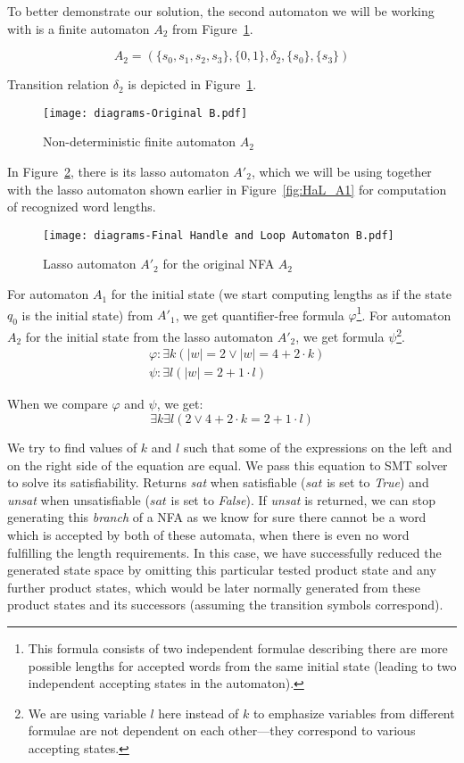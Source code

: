 To better demonstrate our solution, the second automaton we will be working with is a finite automaton $A_2$ from Figure~\ref{fig:NFA_A2_orig}.

$$ A_2 = (\{s_0, s_1, s_2, s_3\}, \{0, 1\}, \delta_2, \{s_0\}, \{s_3\}) $$

Transition relation $\delta_2$ is depicted in Figure~\ref{fig:NFA_A2_orig}.

\begin{figure}[ht]
    \centering
	\texttt{[image: diagrams-Original B.pdf]}
	\caption{Non-deterministic finite automaton $A_2$}
	\label{fig:NFA_A2_orig}
\end{figure}

In Figure~\ref{fig:HaL_A2}, there is its lasso automaton $A'_2$, which we will be using together with the lasso automaton shown earlier in Figure~\ref{fig:HaL_A1} for computation of recognized word lengths.

\begin{figure}[ht]
    \centering
	\texttt{[image: diagrams-Final Handle and Loop Automaton B.pdf]}
	\caption{Lasso automaton $A'_2$ for the original NFA $A_2$}
	\label{fig:HaL_A2}
\end{figure}

For automaton $A_1$ for the initial state (we start computing lengths as if the state $q_0$ is the initial state) from $A'_1$, we get quantifier-free formula $\varphi$\footnote{This formula consists of two independent formulae describing there are more possible lengths for accepted words from the same initial state (leading to two independent accepting states in the automaton).}. For automaton $A_2$ for the initial state from the lasso automaton $A'_2$, we get formula $\psi$\footnote{We are using variable $l$ here instead of $k$ to emphasize variables from different formulae are not dependent on each other---they correspond to various accepting states.}.
\begin{align*}
    &\varphi: \exists k(|w| = 2 \lor |w| = 4 + 2 \cdot k) \\
    &\psi: \exists l(|w| = 2 + 1 \cdot l)
\end{align*}

When we compare $\varphi$ and $\psi$, we get:
$$ \exists k \exists l (2 \lor 4 + 2 \cdot k = 2 + 1 \cdot l) $$

We try to find values of $k$ and $l$ such that some of the expressions on the left and on the right side of the equation are equal. We pass this equation to SMT solver to solve its satisfiability. Returns \emph{sat} when satisfiable ($sat$ is set to \emph{True}) and \emph{unsat} when unsatisfiable ($sat$ is set to \emph{False}). If \emph{unsat} is returned, we can stop generating this \emph{branch} of a NFA as we know for sure there cannot be a word which is accepted by both of these automata, when there is even no word fulfilling the length requirements. In this case, we have successfully reduced the generated state space by omitting this particular tested product state and any further product states, which would be later normally generated from these product states and its successors (assuming the transition symbols correspond).

